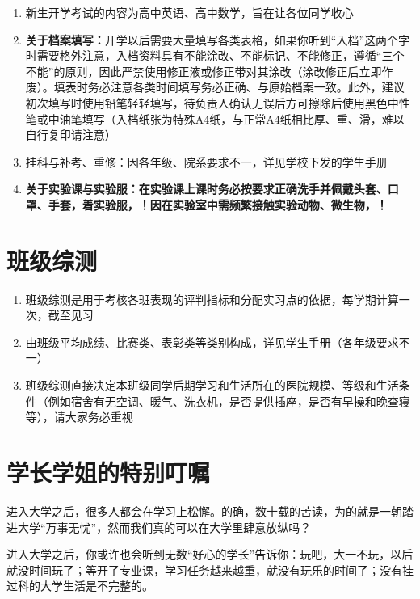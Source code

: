 \begin{enumerate}
    \item 新生开学考试\footnotemark 的内容为高中英语、高中数学，旨在让各位同学收心
    \item \textbf{关于档案填写：}开学以后需要大量填写各类表格，如果你听到“入档”这两个字时需要格外注意，入档资料具有不能涂改、不能标记、不能修正，遵循“三个不能”的原则，因此严禁使用修正液或修正带对其涂改（涂改修正后立即作废）。填表时务必注意各类时间填写务必正确、与原始档案一致。此外，建议初次填写时使用铅笔轻轻填写，待负责人确认无误后方可擦除后使用黑色中性笔或中油笔填写（入档纸张为特殊A4纸，与正常A4纸相比厚、重、滑，难以自行复印请注意）
    \item 挂科与补考、重修：因各年级、院系要求不一，详见学校下发的学生手册
    \item \textbf{关于实验课与实验服：在实验课上课时务必按要求正确洗手并佩戴头套、口罩、手套，着实验服，！因在实验室中需频繁接触实验动物、微生物，！}
\end{enumerate}

\section[班级综测]{班级综测}
\label{class_evaluation}
\begin{enumerate}
    \item 班级综测是用于考核各班表现的评判指标和分配实习点的依据\footnotemark，每学期计算一次，截至见习
    \item 由班级平均成绩、比赛类、表彰类等类别构成，详见学生手册（各年级要求不一）
    \item 班级综测直接决定本班级同学后期学习和生活所在的医院规模、等级和生活条件（例如宿舍有无空调、暖气、洗衣机，是否提供插座，是否有早操和晚查寝\footnotemark 等），请大家务必重视
\end{enumerate}

\section[学长学姐的特别叮嘱]{学长学姐的特别叮嘱}

进入大学之后，很多人都会在学习上松懈。的确，数十载的苦读，为的就是一朝踏进大学“万事无忧”，然而我们真的可以在大学里肆意放纵吗？

进入大学之后，你或许也会听到无数“好心的学长”告诉你：玩吧，大一不玩，以后就没时间玩了；等开了专业课，学习任务越来越重，就没有玩乐的时间了；没有挂过科的大学生活是不完整的。

